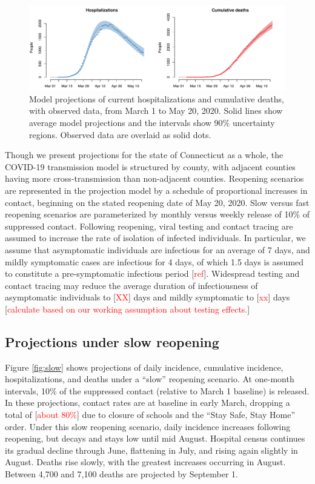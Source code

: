 \documentclass[11pt]{article}
\newcommand{\comment}[1]{[\textcolor{red}{#1}]}
\begin{document}
\begin{figure}
\centering
\includegraphics[width=\textwidth]{figures/calibration.pdf}
\caption{Model projections of current hospitalizations and cumulative deaths, with observed data, from March 1 to May 20, 2020. Solid lines show average model projections and the intervals show 90\% uncertainty regions.  Observed data are overlaid as solid dots.} 
\label{fig:calibration}
\end{figure}

Though we present projections for the state of Connecticut as a whole, the COVID-19 transmission model is structured by county, with adjacent counties having more cross-transmission than non-adjacent counties.  Reopening scenarios are represented in the projection model by a schedule of proportional increases in contact, beginning on the stated reopening date of May 20, 2020. Slow versus fast reopening scenarios are parameterized by monthly versus weekly release of 10\% of suppressed contact.  Following reopening, viral testing and contact tracing are assumed to increase the rate of isolation of infected individuals. In particular, we assume that asymptomatic individuals are infectious for an average of 7 days, and mildly symptomatic cases are infectious for 4 days, of which 1.5 days is assumed to constitute a pre-symptomatic infectious period \comment{ref}. Widespread testing and contact tracing may reduce the average duration of infectiousness of asymptomatic individuals to \comment{XX} days and mildly symptomatic to \comment{xx} days \comment{calculate based on our working assumption about testing effects.}






\subsection*{Projections under slow reopening} 

Figure \ref{fig:slow} shows projections of daily incidence, cumulative incidence, hospitalizations, and deaths under a ``slow'' reopening scenario. At one-month intervals, 10\% of the suppressed contact (relative to March 1 baseline) is released.  In these projections, contact rates are at baseline in early March, dropping a total of \comment{about 80\%} due to closure of schools and the ``Stay Safe, Stay Home'' order.  Under this slow reopening scenario, daily incidence increases following reopening, but decays and stays low until mid August.  Hospital census continues its gradual decline through June, flattening in July, and rising again slightly in August. Deaths rise slowly, with the greatest increases occurring in August. Between 4,700 and 7,100 deaths are projected by September 1.  
\end{document}

